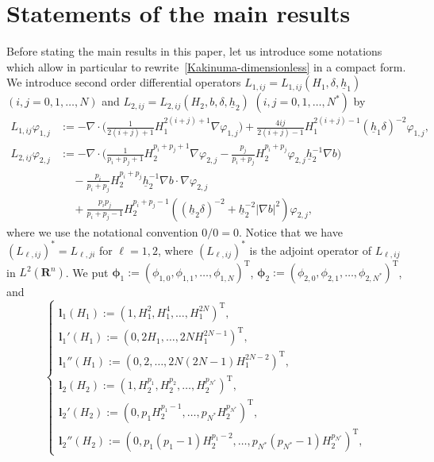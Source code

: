 \documentclass[11pt,leqno]{article}
\numberwithin{equation}{section}
\numberwithin{figure}{section}
\begin{document}
\section{Statements of the main results}\label{S.main-results}
%
Before stating the main results in this paper, let us introduce some notations
which allow in particular to rewrite~\eqref{Kakinuma-dimensionless} in a compact form.
We introduce second order differential operators $L_{1,ij} = L_{1,ij}(H_1,\delta,\underline{h}_1)$ $(i,j=0,1,\ldots,N)$ 
and $L_{2,ij} = L_{2,ij}(H_2,b,\delta,\underline{h}_2)$ $(i,j=0,1,\ldots,N^*)$ by 
%
\begin{align}\label{operatorLij-delta}
L_{1,ij}\varphi_{1,j}
&:= - \nabla\cdot\biggl( \frac{1}{2(i+j)+1}H_1^{2(i+j)+1}\nabla\varphi_{1,j} \biggr) 
   + \frac{4ij}{2(i+j)-1}H_1^{2(i+j)-1}(\underline{h}_1\delta)^{-2}\varphi_{1,j}, \\
L_{2,ij}\varphi_{2,j} \label{operatorLij2-delta}
&:= - \nabla\cdot\biggl(
   \frac{1}{p_i+p_j+1}H_2^{p_i+p_j+1}\nabla\varphi_{2,j}
   - \frac{p_j}{p_i+p_j}H_2^{p_i+p_j}\varphi_{2,j}\underline{h}_2^{-1}\nabla b\biggr) \\[0.5ex]
&\quad\,
  - \frac{p_i}{p_i+p_j}H_2^{p_i+p_j}\underline{h}_2^{-1}\nabla b\cdot\nabla\varphi_{2,j} \nonumber \\[0.5ex] 
&\quad\,
   + \frac{p_ip_j}{p_i+p_j-1}H_2^{p_i+p_j-1}((\underline{h}_2\delta)^{-2}+ \underline{h}_2^{-2}|\nabla b|^2)\varphi_{2,j},
  \nonumber
\end{align}
where we use the notational convention $0/0 = 0$.
%
Notice that we have $(L_{\ell,ij})^*=L_{\ell,ji}$ for $\ell=1,2$, where $(L_{\ell,ij})^*$ is the adjoint operator of 
$L_{\ell,ij}$ in $L^2(\mathbf{R}^n)$.  
We put ${\bm \phi}_1 := (\phi_{1,0},\phi_{1,1},\ldots,\phi_{1,N})^\mathrm{T}$, 
${\bm \phi}_2 := (\phi_{2,0},\phi_{2,1},\ldots,\phi_{2,N^*})^\mathrm{T}$, and 
%
\begin{equation}\label{def-l1l2}
\begin{cases}
{\bm l}_1(H_1) := (1,H_1^2,H_1^4,\ldots,H_1^{2N})^\mathrm{T},\\
{\bm l}_1'(H_1) := (0,2H_1,\ldots,2N H_1^{2N-1})^\mathrm{T}, \\
 {\bm l}_1''(H_1) := (0,2,\ldots,2N(2N-1) H_1^{2N-2})^\mathrm{T} , \\
 {\bm l}_2(H_2) := (1,H_2^{p_1},H_2^{p_2},\ldots,H_2^{p_{N^*}})^\mathrm{T}, \\
{\bm l}_2'(H_2) := (0,p_1 H_2^{p_1-1},\ldots,p_{N^*}H_2^{p_{N^*}})^\mathrm{T}, \\
{\bm l}_2''(H_2) := (0,p_1(p_1-1) H_2^{p_1-2},\ldots,p_{N^*}(p_{N^*}-1)H_2^{p_{N^*}})^\mathrm{T}, 
\end{cases}
\end{equation}
\end{document}
